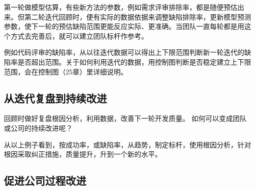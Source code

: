 第一轮做模型估算，有些新方法的参数，例如需求评审排除率，都是随便预估出来。但第二轮迭代回顾时，便有实际的数据依据来调整缺陷排除率，更新模型预测参数，使下一轮的预估缺陷范围更能反应实际、更准确。当团队一直每轮都是用这个方式去完善后，就可以建立团队标杆作参考。

例如代码评审的缺陷率，从以往迭代数据可以得出上下限范围判断新一轮迭代的缺陷率是否超出范围。关于如何利用迭代的数据，用控制图判断是否稳定建立上下限范围，会在控制图（25章）里详细说明。


\hypertarget{ux4eceux8fedux4ee3ux590dux76d8ux5230ux6301ux7eedux6539ux8fdb}{%
\subsection{从迭代复盘到持续改进}\label{ux4eceux8fedux4ee3ux590dux76d8ux5230ux6301ux7eedux6539ux8fdb}}

回顾时做好复盘根因分析，利用数据，改善下一轮开发质量。
如何可以变成团队或公司的持续改进呢？


从以上例子看到，按成功率，或缺陷率，从趋势，制定标杆，使用根因分析，针对根因采取纠正措施，质量提升，升到一个新的水平。


\hypertarget{ux7ed3ux675fux8bed}{%
\subsection{促进公司过程改进}\label{ux7ed3ux675fux8bed}}

